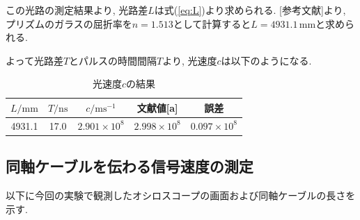 \documentclass{jarticle}
\begin{document}
この光路の測定結果より, 光路差$L$は式(\ref{eq:L})より求められる.
[参考文献]より, プリズムのガラスの屈折率を$n=1.513$として計算すると$L=4931.1\,\mathrm{mm}$と求められる.

よって光路差$T$とパルスの時間間隔$T$より, 光速度$c$は以下のようになる.

\begin{table}[h]
  \centering
  \caption{光速度$c$の結果}
  \begin{tabular}{ccccc}
    \hline
    $L/\mathrm{mm}$ & $T/\mathrm{ns}$ & $c/\mathrm{ms^{-1}}$ & 文献値[a] & 誤差 \\
    \hline
    4931.1 & 17.0 & $2.901\times10^8$ & $2.998\times10^8$ & $0.097\times10^8$ \\
    \hline
  \end{tabular}
\end{table}


\subsection{同軸ケーブルを伝わる信号速度の測定}

以下に今回の実験で観測したオシロスコープの画面および同軸ケーブルの長さを示す.
\end{document}
